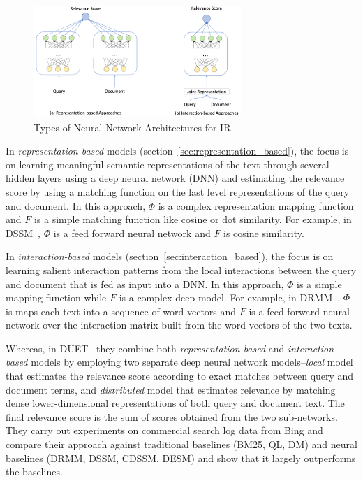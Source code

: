 \begin{figure}
    \centering
    \includegraphics[width=0.7\textwidth]{Figures/neural_ir_types.png}
    \caption{Types of Neural Network Architectures for IR.}
    \label{fig:neural_ir_types}
\end{figure}

In \textit{representation-based} models (section~\ref{sec:representation_based}), the focus is on learning meaningful semantic representations of the text through several hidden layers using a deep neural network (DNN) and estimating the relevance score by using a matching function on the last level representations of the query and document. In this approach, $\Phi$ is a complex representation mapping function and $F$ is a simple matching function like cosine or dot similarity. For example, in DSSM~\citep{dssm13}, $\Phi$ is a feed forward neural network and $F$ is cosine similarity.

In \textit{interaction-based} models (section~\ref{sec:interaction_based}), the focus is on learning salient interaction patterns from the local interactions between the query and document that is fed as input into a DNN. In this approach, $\Phi$ is a simple mapping function while $F$ is a complex deep model. For example, in DRMM~\citep{Guo2016}, $\Phi$ is maps each text into a sequence of word vectors and $F$ is a feed forward neural network over the interaction matrix built from the word vectors of the two texts.

Whereas, in DUET~\citep{Mitra2017a} they combine both \textit{representation-based} and \textit{interaction-based} models by employing two separate deep neural network models--\textit{local} model that estimates the relevance score according to exact matches between query and document terms, and \textit{distributed} model that estimates relevance by matching dense lower-dimensional representations of both query and document text. The final relevance score is the sum of scores obtained from the two sub-networks. They carry out experiments on commercial search log data from Bing and compare their approach against traditional baselines (BM25, QL, DM) and neural baselines (DRMM, DSSM, CDSSM, DESM) and show that it largely outperforms the baselines. 

